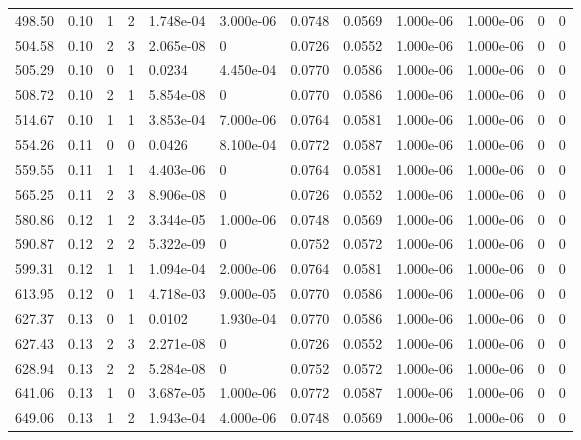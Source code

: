 \documentclass[preview]{standalone}
\begin{document}
{{{\begin{tabular}{L{1.2cm}C{1.2cm} C{0.3cm}C{0.5cm} C{1.4cm}C{1.4cm} C{1.4cm}C{1.4cm} C{1.6cm}C{1.6cm} C{1.6cm}C{1.6cm}}
  498.50  &  0.10  & 1     &  2 &  1.748e-04  & 3.000e-06  &  0.0748&   0.0569& 1.000e-06 & 1.000e-06   &  0 & 0  \\ 
  504.58  &  0.10  & 2     &  3 &  2.065e-08  & 0  &  0.0726&   0.0552& 1.000e-06 & 1.000e-06   &  0 & 0  \\ 
  505.29  &  0.10  & 0     &  1 &  0.0234  & 4.450e-04  &  0.0770&   0.0586& 1.000e-06 & 1.000e-06   &  0 & 0  \\ 
  508.72  &  0.10  & 2     &  1 &  5.854e-08  & 0  &  0.0770&   0.0586& 1.000e-06 & 1.000e-06   &  0 & 0  \\ 
  514.67  &  0.10  & 1     &  1 &  3.853e-04  & 7.000e-06  &  0.0764&   0.0581& 1.000e-06 & 1.000e-06   &  0 & 0  \\ 
  554.26  &  0.11  & 0     &  0 &  0.0426  & 8.100e-04  &  0.0772&   0.0587& 1.000e-06 & 1.000e-06   &  0 & 0  \\ 
  559.55  &  0.11  & 1     &  1 &  4.403e-06  & 0  &  0.0764&   0.0581& 1.000e-06 & 1.000e-06   &  0 & 0  \\ 
  565.25  &  0.11  & 2     &  3 &  8.906e-08  & 0  &  0.0726&   0.0552& 1.000e-06 & 1.000e-06   &  0 & 0  \\ 
  580.86  &  0.12  & 1     &  2 &  3.344e-05  & 1.000e-06  &  0.0748&   0.0569& 1.000e-06 & 1.000e-06   &  0 & 0  \\ 
  590.87  &  0.12  & 2     &  2 &  5.322e-09  & 0  &  0.0752&   0.0572& 1.000e-06 & 1.000e-06   &  0 & 0  \\ 
  599.31  &  0.12  & 1     &  1 &  1.094e-04  & 2.000e-06  &  0.0764&   0.0581& 1.000e-06 & 1.000e-06   &  0 & 0  \\ 
  613.95  &  0.12  & 0     &  1 &  4.718e-03  & 9.000e-05  &  0.0770&   0.0586& 1.000e-06 & 1.000e-06   &  0 & 0  \\ 
  627.37  &  0.13  & 0     &  1 &  0.0102  & 1.930e-04  &  0.0770&   0.0586& 1.000e-06 & 1.000e-06   &  0 & 0  \\ 
  627.43  &  0.13  & 2     &  3 &  2.271e-08  & 0  &  0.0726&   0.0552& 1.000e-06 & 1.000e-06   &  0 & 0  \\ 
  628.94  &  0.13  & 2     &  2 &  5.284e-08  & 0  &  0.0752&   0.0572& 1.000e-06 & 1.000e-06   &  0 & 0  \\ 
  641.06  &  0.13  & 1     &  0 &  3.687e-05  & 1.000e-06  &  0.0772&   0.0587& 1.000e-06 & 1.000e-06   &  0 & 0  \\ 
  649.06  &  0.13  & 1     &  2 &  1.943e-04  & 4.000e-06  &  0.0748&   0.0569& 1.000e-06 & 1.000e-06   &  0 & 0  \\ 

\end{tabular}}}}
\end{document}
